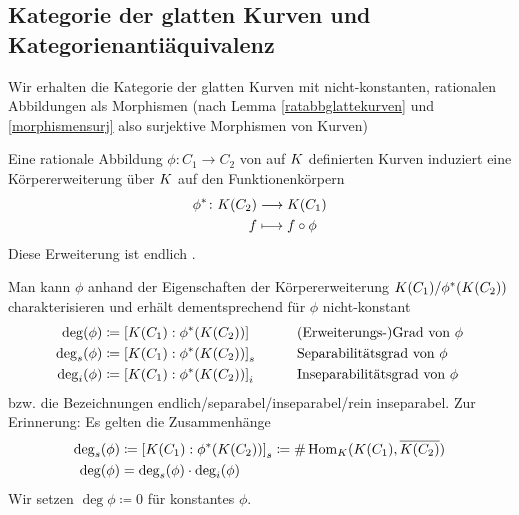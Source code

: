 
\subsection{Kategorie der glatten Kurven und Kategorienantiäquivalenz}
\begin{Bemerkung}
  Wir erhalten die Kategorie der glatten Kurven
  mit nicht-konstanten, rationalen Abbildungen als Morphismen 
  (nach Lemma \ref{ratabbglattekurven} und \ref{morphismensurj} also
  surjektive Morphismen von Kurven)
\end{Bemerkung}

\begin{LemmaDefinition}\label{funktionenkoerper}
  Eine rationale Abbildung $\phi\colon C_1\to C_2$ von auf $K$
  definierten Kurven induziert eine Körpererweiterung über $K$ auf
  den Funktionenkörpern
  \begin{align*}
    \phi^* \colon K(C_2) &\longrightarrow K(C_1)\\
    f &\longmapsto f\circ \phi
  \end{align*}
  Diese Erweiterung ist endlich
  \cite[siehe][Theorem II.2.4 (a)]{silverman}.

  Man kann $\phi$ anhand der Eigenschaften der Körpererweiterung
  $K(C_1)/\phi^*(K(C_2))$ charakterisieren und erhält
  dementsprechend für $\phi$ nicht-konstant
  \begin{alignat*}{2}
    \deg(\phi) &\coloneqq \left[ K(C_1) : \phi^*(K(C_2)) \right]
    \qquad&&\text{(Erweiterungs-)Grad von }\phi\\
    \operatorname{\deg}_s(\phi) &\coloneqq \left[ K(C_1) : \phi^*(K(C_2)) \right]_s
    \qquad&&\text{Separabilitätsgrad von }\phi\\
    \operatorname{\deg}_i(\phi) &\coloneqq \left[ K(C_1) : \phi^*(K(C_2)) \right]_i
    \qquad&&\text{Inseparabilitätsgrad von }\phi
  \end{alignat*}
  bzw. die Bezeichnungen endlich/separabel/inseparabel/rein
  inseparabel. Zur Erinnerung: Es gelten die Zusammenhänge
  \begin{align*}
    \operatorname{\deg}_s(\phi) 
    &\coloneqq \left[ K(C_1) : \phi^*(K(C_2)) \right]_s
      \coloneqq \#\operatorname{Hom}_K(K(C_1), \overline{K(C_2)})\\
    \deg(\phi) &= \operatorname{\deg}_s(\phi)\cdot\operatorname{\deg}_i(\phi)
  \end{align*}
  Wir setzen $\deg\phi\coloneqq 0$ für konstantes $\phi$.
\end{LemmaDefinition}

